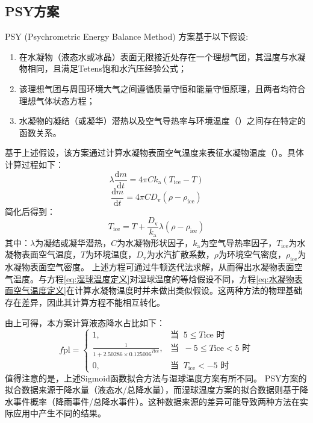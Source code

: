 \subsection{PSY方案}
PSY (Psychrometric Energy Balance Method) 方案基于以下假设:
\begin{enumerate}
\item 在水凝物（液态水或冰晶）表面无限接近处存在一个理想气团，其温度与水凝物相同，且满足Tetens饱和水汽压经验公式；
\item 该理想气团与周围环境大气之间遵循质量守恒和能量守恒原理，且两者均符合理想气体状态方程；
\item 水凝物的凝结（或凝华）潜热以及空气导热率与环境温度（\textcelsius）之间存在特定的函数关系。
\end{enumerate}
基于上述假设，该方案通过计算水凝物表面空气温度来表征水凝物温度（\textcelsius）。具体计算过程如下：
\begin{equation}
\lambda\frac{\mathrm{d}m}{\mathrm{d}t} = 4\pi Ck_{\mathrm{a}}(T_{\mathrm{ice}} - T)
\end{equation}
\begin{equation}
\frac{\mathrm{d}m}{\mathrm{d}t} = 4\pi CD_{\mathrm{v}}(\rho - \rho_{\mathrm{ice}})
\end{equation}
简化后得到：
\begin{equation}
\label{eq:水凝物表面空气温度定义}
T_{\mathrm{ice}} = T + \frac{D_{\mathrm{v}}}{k_{\mathrm{a}}}\lambda(\rho - \rho_{\mathrm{ice}})
\end{equation}
其中：$\lambda$为凝结或凝华潜热，$C$为水凝物形状因子，$k_{\mathrm{a}}$为空气导热率因子，$T_{\mathrm{ice}}$为水凝物表面空气温度，$T$为环境温度，$D_{\mathrm{v}}$为水汽扩散系数，$\rho$为环境空气密度，$\rho_{\mathrm{ice}}$为水凝物表面空气密度。
上述方程可通过牛顿迭代法求解，从而得出水凝物表面空气温度。与方程\eqref{eq:湿球温度定义}对湿球温度的等焓假设不同，方程\eqref{eq:水凝物表面空气温度定义}在计算水凝物温度时并未做出类似假设。这两种方法的物理基础存在差异，因此其计算方程不能相互转化。


由上可得，本方案计算液态降水占比如下：
\begin{equation}
  f{\mathrm{pl}}= \begin{cases}
    1, & \text{当 }\ 5\leqslant T{\mathrm {ice}} \text{ 时}\\
    \frac{1}{1 + 2.50286\times 0.125006^{T{\mathrm{ice}}}}, & \text{当 }\ -5\leqslant T{\mathrm {ice}} < 5 \text{ 时} \\
    0, & \text{当 }\ T_{\mathrm {ice}} < -5 \text{ 时}
  \end{cases}
\end{equation}
值得注意的是，上述Sigmoid函数拟合方法与湿球温度方案有所不同。
PSY方案的拟合数据来源于降水量（液态水/总降水量），而湿球温度方案的拟合数据则基于降水事件概率（降雨事件/总降水事件）。这种数据来源的差异可能导致两种方法在实际应用中产生不同的结果。


